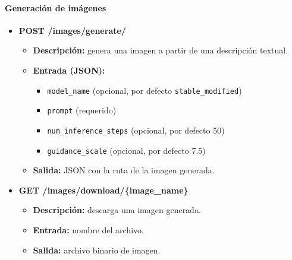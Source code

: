 \paragraph{Generación de imágenes}
\begin{itemize}
    \item \textbf{POST /images/generate/}
    \begin{itemize}
        \item \textbf{Descripción:} genera una imagen a partir de una descripción textual.
        \item \textbf{Entrada (JSON):}
        \begin{itemize}
            \item \texttt{model\_name} (opcional, por defecto \texttt{stable\_modified})
            \item \texttt{prompt} (requerido)
            \item \texttt{num\_inference\_steps} (opcional, por defecto 50)
            \item \texttt{guidance\_scale} (opcional, por defecto 7.5)
        \end{itemize}
        \item \textbf{Salida:} JSON con la ruta de la imagen generada.
    \end{itemize}

    \item \textbf{GET /images/download/\{image\_name\}}
    \begin{itemize}
        \item \textbf{Descripción:} descarga una imagen generada.
        \item \textbf{Entrada:} nombre del archivo.
        \item \textbf{Salida:} archivo binario de imagen.
    \end{itemize}
\end{itemize}

